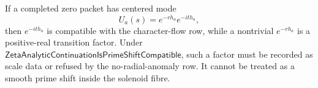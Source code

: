 \begin{principle}
\label{prin:rh-prime-shift-analytic-compatibility-rh-role}
If a completed zero packet has centered mode
$$
U_a(s)=e^{-rh_a}e^{-ith_a},
$$
then $e^{-ith_a}$ is compatible with the character-flow row, while a
nontrivial $e^{-rh_a}$ is a positive-real transition factor. Under
$\mathsf{ZetaAnalyticContinuationIsPrimeShiftCompatible}$, such a factor
must be recorded as scale data or refused by the no-radial-anomaly row.
It cannot be treated as a smooth prime shift inside the solenoid fibre.
\end{principle}

